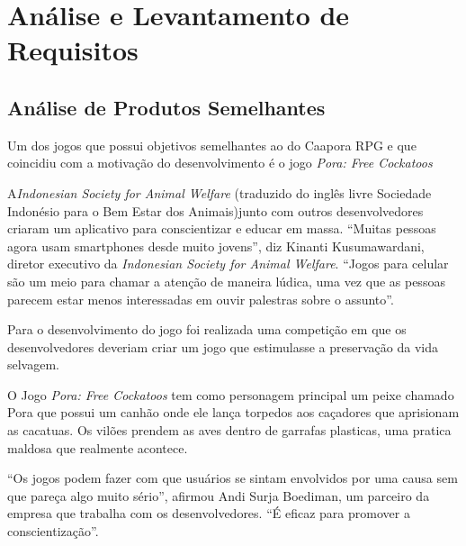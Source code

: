 \chapter{Análise e Levantamento de Requisitos}
\label{chap:Analise-e-levantamento-de-requisitos}

\section{Análise de Produtos Semelhantes}
\label{sec:analise-de-produtos-semelhantes}

Um dos jogos que possui objetivos semelhantes ao do Caapora RPG e que coincidiu com a motivação do desenvolvimento é o jogo \textit{Pora: Free Cockatoos}

A\textit{Indonesian Society for Animal Welfare} (traduzido do inglês livre Sociedade Indonésio para o Bem Estar dos Animais)junto com outros desenvolvedores
criaram um aplicativo para conscientizar e educar em massa. “Muitas pessoas agora usam smartphones desde muito jovens”, diz Kinanti Kusumawardani, diretor executivo da \textit{Indonesian Society for Animal Welfare}. “Jogos para celular são um meio para chamar a atenção de maneira lúdica, uma vez que as pessoas parecem estar menos interessadas em ouvir palestras sobre o assunto”.

Para o desenvolvimento do jogo foi realizada uma competição em que os desenvolvedores deveriam criar um jogo que estimulasse a preservação da vida selvagem.

O Jogo \textit{Pora: Free Cockatoos} tem como personagem principal um peixe chamado Pora que possui um canhão onde ele lança torpedos aos caçadores que aprisionam as cacatuas.
Os vilões prendem as aves dentro de garrafas plasticas, uma pratica maldosa que realmente acontece.

“Os jogos podem fazer com que usuários se sintam envolvidos por uma causa sem que pareça algo muito sério”, afirmou Andi Surja Boediman, um parceiro da empresa que trabalha com os desenvolvedores. “É eficaz para promover a conscientização”. 

\begin{figure}[h!]
		\centering
	\end{figure}
\pagebreak
